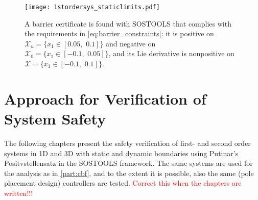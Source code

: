 \begin{figure}[htbp]
	\hspace*{-12mm}
	\texttt{[image: 1stordersys\_staticlimits.pdf]}
	\caption{A barrier certificate is found with SOSTOOLS that complies with the requirements in \autoref{eq:barrier_constraints}: it is positive on $\mathcal{X}_u=\{x_1\in [0.05,\,\,0.1]\}$ and negative on $\mathcal{X}_0=\{x_1\in [-0.1,\,\,0.05]\}$, and its Lie derivative is nonpositive on $\mathcal{X}=\{x_1\in [-0.1,\,\,0.1]\}$.}
	\label{fig:barrier_1storder_staticlim}
\end{figure}

\section{Approach for Verification of System Safety}

The following chapters present the safety verification of first- and second order systems in 1D and 3D with static and dynamic boundaries using Putinar's Positvstellensatz in the SOSTOOLS framework. The same systems are used for the analysis as in \autoref{part:cbf}, and to the extent it is possible, also the same (pole placement design) controllers are tested. \textcolor{red}{Correct this when the chapters are written!!!}


